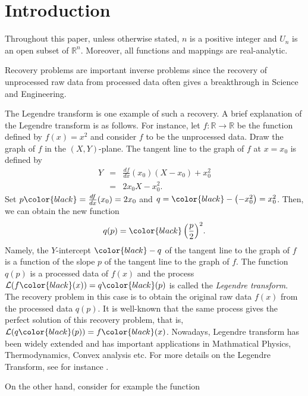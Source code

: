 \documentclass{amsart}
\theoremstyle{definition}
\theoremstyle{definition}
\theoremstyle{definition}
\begin{document}
\section{Introduction}\label{section1}
Throughout this paper, unless otherwise stated, 
$n$ is a positive integer %
and $U_n$ is an open subset 
of $\mathbb{R}^n$.   Moreover, all functions and 
mappings are {\color{black}real-analytic}. 

Recovery problems are important inverse problems since the  
recovery of unprocessed raw data from processed data often gives a 
 breakthrough in Science and Engineering.     
\par 
The Legendre transform is one example of such a recovery.   
A brief explanation of the Legendre transform is as follows.   
For instance, let $f: \mathbb{R}\to \mathbb{R}$ be the function defined by 
$f(x)=x^2$ and consider $f$ to be the unprocessed data.     
Draw the graph of $f$ in the $(X, Y)$-plane.    
The tangent line to the graph of $f$ at $x=x_0$ is defined by 
\begin{eqnarray*}
Y & = & \frac{df}{dx}\left(x_0\right)\left(X-x_0\right)+x^2_0 \\ 
{ } & = & 2x_0X-x^2_0.   
\end{eqnarray*}
Set $p{\color{black}=\frac{df}{dx}(x_0)}=2x_0$ and 
$q= {\color{black}-\left(-x_0^2\right)=x^2_0}$.    
Then, we can obtain the new function 
\[
q(p)= {\color{black}\left(\frac{p}{2}\right)^2}.   
\]
Namely, the $Y$-intercept ${\color{black}-q}$ 
of the tangent line to the graph of $f$ 
is a function of the slope $p$ of the tangent line to the graph of $f$.   
The function $q(p)$ is a processed data of $f(x)$ and the process 
$\mathcal{L}(f{\color{black}(x)})= q{\color{black}(p)}$ 
is called the \textit{Legendre transform}.    
The recovery problem in this case is to obtain the original raw data $f(x)$ 
from the processed data $q(p)$. It is well-known that the same process gives 
the perfect solution of this recovery problem, that is, 
$\mathcal{L}(q{\color{black}(p)})=f{\color{black}(x)}$.     
Nowadays, Legendre transform has been widely extended 
and has important applications in Mathmatical Physics, 
Thermodynamics, Convex analysis etc.      
For more details on the Legendre Transform, see for instance 
{\color{black}\cite{arnoldmechanics, hormander, rockafellar}}.    
\par 
On the other hand,  consider for example the function 
\end{document}

